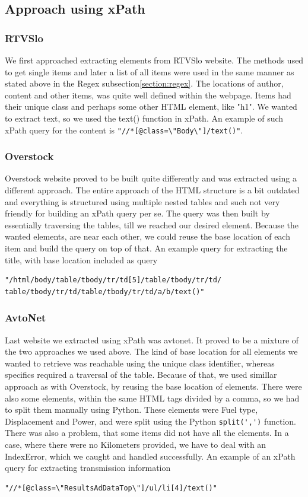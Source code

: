 \documentclass[9pt]{IEEEtran}
\begin{document}
\subsection{Approach using xPath}
\label{section:xpath}
\subsubsection{RTVSlo}
We first approached extracting elements from RTVSlo website. The methods used to get single items and later a list of all items were used in the same manner as stated above in the Regex subsection\ref{section:regex}. The locations of author, content and other items, was quite well defined within the webpage. Items had their unique class and perhaps some other HTML element, like "h1". We wanted to extract text, so we used the text() function in xPath. An example of such xPath query for the content is 
\verb|"//*[@class=\"Body\"]/text()"|.
\subsubsection{Overstock}
Overstock website proved to be built quite differently and was extracted using a different approach. 
The entire approach of the HTML structure is a bit outdated and everything is structured using multiple nested tables and such not very friendly for building an xPath query per se. 
The query was then built by essentially traversing the tables, till we reached our desired element. 
Because the wanted elements, are near each other, we could reuse the base location of each item and build the query on top of that. 
An example query for extracting the title, with base location included as query
\begin{verbatim}
"/html/body/table/tbody/tr/td[5]/table/tbody/tr/td/
table/tbody/tr/td/table/tbody/tr/td/a/b/text()"
\end{verbatim}

\subsubsection{AvtoNet}
Last website we extracted using xPath was avtonet. It proved to be a mixture of the two approaches we used above. The kind of base location for all elements we wanted to retrieve was reachable using the unique class identifier, whereas specifics required a traversal of the table. 
Because of that, we used simillar approach as with Overstock, by reusing the base location of elements.
There were also some elements, within the same HTML tags divided by a comma, so we had to split them manually using Python.
These elements were Fuel type, Displacement and Power, and were split using the Python \verb/split(',')/ function. 
There was also a problem, that some items did not have all the elements. In a case, where there were no Kilometers provided, we have to deal with an IndexError, which we caught and handled successfully. 
An example of an xPath query for extracting transmission information
\begin{verbatim}
"//*[@class=\"ResultsAdDataTop\"]/ul/li[4]/text()"
\end{verbatim}
\end{document}
